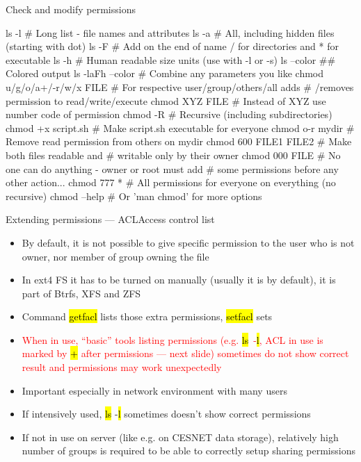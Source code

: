\documentclass[compress, ucs, xelatex, 11pt, xcolor=svgnames, aspectratio=169,
	hyperref={
		bookmarks=true,
		unicode=true,
		colorlinks=true,
		pdftitle={Linux, command line and MetaCentrum},
		plainpages=false,
		pdfauthor={Vojtech Zeisek},
		pdfsubject={Course about use of Linux command line, writing shell scripts and using MetaCentrum of CESNET},
		pdfcreator={XeLaTeX},
		pdfkeywords={Linux, GNU, BASH, shell, command line, MetaCentrum},
		linkcolor=DarkRed, %
		anchorcolor=DarkBlue, %
		citecolor=Indigo, %
		filecolor=NavyBlue, %
		menucolor=DarkMagenta, %
		urlcolor=DarkBlue, %
		pdftex},
	url={hyphens, lowtilde} %
	]{beamer}
\renewcommand{\texttt}[1]{\hl{\ttfamily #1}}
\renewcommand{\alert}[1]{\textcolor{red}{#1}}
\begin{document}
\begin{frame}[fragile]{Check and modify permissions}
	\begin{bashcode}
    ls -l # Long list - file names and attributes
    ls -a # All, including hidden files (starting with dot)
    ls -F # Add on the end of name / for directories and * for executable
    ls -h # Human readable size units (use with -l or -s)
    ls --color ## Colored output
    ls -laFh --color # Combine any parameters you like
    chmod u/g/o/a+/-r/w/x FILE # For respective user/group/others/all adds
                               # /removes permission to read/write/execute
    chmod XYZ FILE # Instead of XYZ use number code of permission
    chmod -R # Recursive (including subdirectories)
    chmod +x script.sh # Make script.sh executable for everyone
    chmod o-r mydir # Remove read permission from others on mydir
    chmod 600 FILE1 FILE2 # Make both files readable and
                          # writable only by their owner
    chmod 000 FILE # No one can do anything - owner or root must add
                   # some permissions before any other action...
    chmod 777 * # All permissions for everyone on everything (no recursive)
    chmod --help # Or 'man chmod' for more options
	\end{bashcode}
\end{frame}

\begin{frame}{Extending permissions --- ACL}{Access control list}
	\label{acl}
	\begin{itemize}
		\item By default, it is not possible to give specific permission to the user who is not owner, nor member of group owning the file
		\item In ext4 FS it has to be turned on manually (usually it is by default), it is part of Btrfs, XFS and ZFS
		\item Command \texttt{getfacl} lists those extra permissions, \texttt{setfacl} sets
		\item \alert{When in use, \enquote{basic} tools listing permissions (e.g. \texttt{ls}~-\texttt{l}, ACL in use is marked by \texttt{+} after permissions --- next slide) sometimes do not show correct result and permissions may work unexpectedly}
		\item Important especially in network environment with many users
		\item If intensively used, \texttt{ls} -\texttt{l} sometimes doesn't show correct permissions
		\item If not in use on server (like e.g. on CESNET data storage), relatively high number of groups is required to be able to correctly setup sharing permissions
	\end{itemize}
\end{frame}
\end{document}
